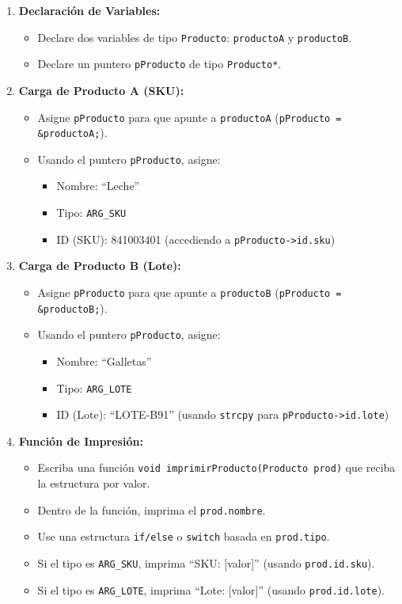 \begin{enumerate}
    \item \textbf{Declaración de Variables:}
    \begin{itemize}
        \item Declare dos variables de tipo \texttt{Producto}: \texttt{productoA} y \texttt{productoB}.
        \item Declare un puntero \texttt{pProducto} de tipo \texttt{Producto*}.
    \end{itemize}

    \item \textbf{Carga de Producto A (SKU):}
    \begin{itemize}
        \item Asigne \texttt{pProducto} para que apunte a \texttt{productoA} (\texttt{pProducto = \&productoA;}).
        \item Usando el puntero \texttt{pProducto}, asigne:
        \begin{itemize}
            \item Nombre: ``Leche''
            \item Tipo: \texttt{ARG\_SKU}
            \item ID (SKU): 841003401 (accediendo a \texttt{pProducto->id.sku})
        \end{itemize}
    \end{itemize}

    \item \textbf{Carga de Producto B (Lote):}
    \begin{itemize}
        \item Asigne \texttt{pProducto} para que apunte a \texttt{productoB} (\texttt{pProducto = \&productoB;}).
        \item Usando el puntero \texttt{pProducto}, asigne:
        \begin{itemize}
            \item Nombre: ``Galletas''
            \item Tipo: \texttt{ARG\_LOTE}
            \item ID (Lote): ``LOTE-B91'' (usando \texttt{strcpy} para \texttt{pProducto->id.lote})
        \end{itemize}
    \end{itemize}

    \item \textbf{Función de Impresión:}
    \begin{itemize}
        \item Escriba una función \texttt{void imprimirProducto(Producto prod)} que reciba la estructura por valor.
        \item Dentro de la función, imprima el \texttt{prod.nombre}.
        \item Use una estructura \texttt{if/else} o \texttt{switch} basada en \texttt{prod.tipo}.
        \item Si el tipo es \texttt{ARG\_SKU}, imprima ``SKU: [valor]'' (usando \texttt{prod.id.sku}).
        \item Si el tipo es \texttt{ARG\_LOTE}, imprima ``Lote: [valor]'' (usando \texttt{prod.id.lote}).
    \end{itemize}


\end{enumerate}
